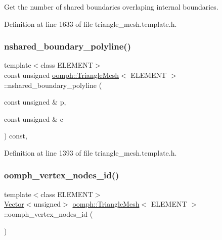 Get the number of shared boundaries overlaping internal boundaries. 



Definition at line 1633 of file triangle\+\_\+mesh.\+template.\+h.

\mbox{\label{classoomph_1_1TriangleMesh_a5540ac8439cbd641020d59c5d57a854f}} 
\subsubsection{\texorpdfstring{nshared\+\_\+boundary\+\_\+polyline()}{nshared\_boundary\_polyline()}}
{\footnotesize\ttfamily template$<$class E\+L\+E\+M\+E\+NT$>$ \\
const unsigned \hyperlink{classoomph_1_1TriangleMesh}{oomph\+::\+Triangle\+Mesh}$<$ E\+L\+E\+M\+E\+NT $>$\+::nshared\+\_\+boundary\+\_\+polyline (\begin{DoxyParamCaption}\item[{const unsigned \&}]{p,  }\item[{const unsigned \&}]{c }\end{DoxyParamCaption}) const\hspace{0.3cm}{\ttfamily [inline]}, {\ttfamily [protected]}}



Definition at line 1393 of file triangle\+\_\+mesh.\+template.\+h.

\mbox{\label{classoomph_1_1TriangleMesh_a993a88563e99dcdb241d87f1988602c9}} 
\subsubsection{\texorpdfstring{oomph\+\_\+vertex\+\_\+nodes\+\_\+id()}{oomph\_vertex\_nodes\_id()}}
{\footnotesize\ttfamily template$<$class E\+L\+E\+M\+E\+NT$>$ \\
\hyperlink{classoomph_1_1Vector}{Vector}$<$unsigned$>$ \hyperlink{classoomph_1_1TriangleMesh}{oomph\+::\+Triangle\+Mesh}$<$ E\+L\+E\+M\+E\+NT $>$\+::oomph\+\_\+vertex\+\_\+nodes\+\_\+id (\begin{DoxyParamCaption}{ }\end{DoxyParamCaption})\hspace{0.3cm}{\ttfamily [inline]}}



